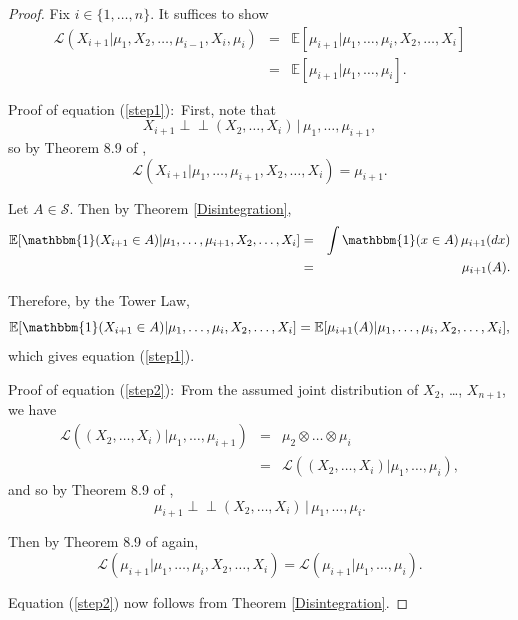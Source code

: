 \documentclass[aap]{imsart}
\theoremstyle{plain}
\theoremstyle{definition}
\def\ci{\perp\!\!\!\perp}
\begin{document}
\begin{proof}
Fix $i \in \{1, \ldots, n\}$. It suffices to show
\begin{eqnarray}
  \mathcal{L}(X_{i+1}|\mu_1, X_2, \ldots, \mu_{i-1}, X_i, \mu_i) & = & \mathbb{E}[\mu_{i+1}|\mu_1, \ldots, \mu_i, X_2, \ldots, X_i] \label{step1}\\
                                                                 & = & \mathbb{E}[\mu_{i+1}|\mu_1, \ldots, \mu_i]. \label{step2}
\end{eqnarray}

  Proof of equation (\ref{step1}):\, First, note that
  \begin{equation*}
    X_{i+1} \ci (X_2, \ldots, X_i) \, | \, \mu_1, \ldots, \mu_{i+1},
  \end{equation*}
  so by Theorem 8.9 of \cite{Kll21},
  \begin{equation*}
    \mathcal{L}(X_{i+1}|\mu_1, \ldots, \mu_{i+1}, X_2, \dots, X_i) = \mu_{i+1}.
  \end{equation*}
  
  Let $A \in \mathcal{S}$. Then by Theorem \ref{Disintegration}, 
  \begin{eqnarray*}
    \mathbb{E}[\mathbbm{1}(X_{i+1} \in A) | \mu_1, \ldots, \mu_{i+1}, X_2, \ldots, X_i] & = & \int \mathbbm{1}(x \in A) \, \mu_{i+1}(dx) \\
                                                                                        & = & \mu_{i+1}(A).
  \end{eqnarray*}

  Therefore, by the Tower Law,
  \begin{equation*}
    \mathbb{E}[\mathbbm{1}(X_{i+1} \in A)|\mu_1, \ldots, \mu_i, X_2, \ldots, X_i] = \mathbb{E}[\mu_{i+1}(A)|\mu_1, \ldots, \mu_i, X_2, \ldots, X_i],
  \end{equation*}
  which gives equation (\ref{step1}).

  Proof of equation (\ref{step2}):\, From the assumed joint distribution of $X_2$, \ldots, $X_{n+1}$, we have
  \begin{eqnarray*}
    \mathcal{L}((X_2, \ldots, X_i)|\mu_1, \ldots, \mu_{i+1}) & = & \mu_2 \otimes \ldots \otimes \mu_i \\
                                                             & = & \mathcal{L}((X_2, \ldots, X_i)|\mu_1, \ldots, \mu_i),
  \end{eqnarray*}
  and so by Theorem 8.9 of \cite{Kll21},
  \begin{equation*}
    \mu_{i+1} \ci (X_2, \ldots, X_i) \, | \, \mu_1, \ldots, \mu_i.
  \end{equation*}

  Then by Theorem 8.9 of \cite{Kll21} again,
  \begin{equation*}
    \mathcal{L}(\mu_{i+1}|\mu_1, \ldots, \mu_i, X_2, \ldots, X_i) = \mathcal{L}(\mu_{i+1}|\mu_1, \ldots, \mu_i).
  \end{equation*}
  
  Equation (\ref{step2}) now follows from Theorem \ref{Disintegration}.
\end{proof}
\end{document}
